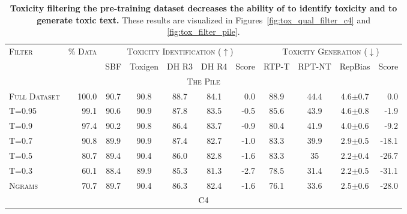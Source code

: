 \begingroup
\setlength{\tabcolsep}{4pt}
\begin{table*}[ht]
    \centering
    \small
    
    \caption{
    \textbf{Toxicity filtering the pre-training dataset decreases the ability of \bigLM to identify toxicity and to generate toxic text.} These results are visualized in Figures~\ref{fig:tox_qual_filter_c4} and \ref{fig:tox_filter_pile}.}
    \label{tab:tox-filter-results}
    
    \begin{tabular}{l | r | cccc | r || ccc | r}
    \toprule
    \textsc{Filter} & \textsc{\% Data} & \multicolumn{5}{c}{\textsc{Toxicity Identification ($\uparrow$)}} & \multicolumn{4}{c}{\textsc{Toxicity Generation ($\downarrow$)}} \\
    & & SBF & Toxigen & DH R3 & DH R4 & Score & RTP-T & RPT-NT & RepBias & Score \\
    \midrule
    \multicolumn{11}{c}{\textsc{The Pile}} \\
    \midrule
    
    \textsc{Full Dataset} & 100.0 & 90.7 & 90.8 & 88.7 & 84.1 & 0.0 & 88.9 & 44.4 & 4.6$\pm$0.7 & 0.0 \\
    \textsc{T=0.95} & 99.1 & 90.6 & 90.9 & 87.8 & 83.5 & \cellcolor{color3!5} -0.5 & 85.6 & 43.9 & 4.6$\pm$0.8 & \cellcolor{color3!20} -1.9 \\
    \textsc{T=0.9} & 97.4 & 90.2 & 90.8 & 86.4 & 83.7 & \cellcolor{color3!10} -0.9 & 80.4 & 41.9 & 4.0$\pm$0.6 & \cellcolor{color3!28} -9.2 \\
    \textsc{T=0.7} & 90.8 & 89.9 & 90.9 & 87.4 & 82.7 & \cellcolor{color3!10} -1.0 & 83.3 & 39.9 & 2.9$\pm$0.5 & \cellcolor{color3!40} -18.1 \\
    \textsc{T=0.5} & 80.7 & 89.4 & 90.4 & 86.0 & 82.8 & \cellcolor{color3!20} -1.6 & 83.3 & 35 & 2.2$\pm$0.4 & \cellcolor{color3!52} -26.7 \\
    \textsc{T=0.3} & 60.1 & 88.4 & 89.9 & 85.3 & 81.3 & \cellcolor{color3!25} -2.7 & 78.5 & 31.4 & 2.2$\pm$0.5 & \cellcolor{color3!62} -31.1 \\
    \textsc{Ngrams} & 70.7 & 89.7 & 90.4 & 86.3 & 82.4 & \cellcolor{color3!20} -1.6 & 76.1 & 33.6 & 2.5$\pm$0.6 & \cellcolor{color3!56} -28.0 \\
    
    \midrule
    \multicolumn{11}{c}{\textsc{C4}} \\
    \midrule


\end{tabular}
\end{table*}
